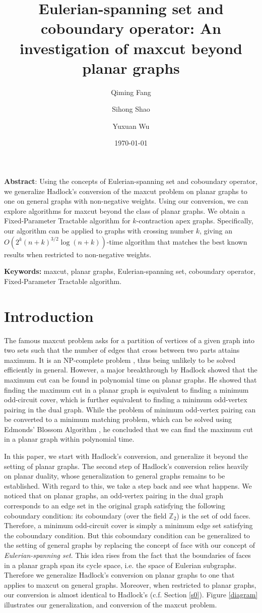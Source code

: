 \documentclass[10pt,fleqn]{article}
\title{Eulerian-spanning set and coboundary operator: An investigation of maxcut beyond planar graphs}
\author{Qiming Fang\footnotemark[1] \and Sihong Shao\footnotemark[3] \and Yuxuan Wu\footnotemark[3]}
\date{\today}
\newcommand{\Z}{\mathbb{Z}}
\begin{document}
	
	\maketitle
	{\small {\textbf{Abstract}:} Using the concepts of Eulerian-spanning set and coboundary operator, we generalize Hadlock's conversion of the maxcut problem on planar graphs to one on general graphs with non-negative weights. Using our conversion, we can explore algorithms for maxcut beyond the class of planar graphs. We obtain a Fixed-Parameter Tractable algorithm for $k$-contraction apex graphs. Specifically, our algorithm can be applied to graphs with crossing number $k$, giving an $O(2^k(n+k)^{3/2}\log (n+k))$-time algorithm that matches the best known results when restricted to non-negative weights.
		
		{\textbf{Keywords:} maxcut, planar graphs, Eulerian-spanning set, coboundary operator, Fixed-Parameter Tractable algorithm.} 
	}
	
	
	\section{Introduction}\label{s1}
	The famous maxcut problem asks for a partition of vertices of a given graph into two sets such that the number of edges that cross between two parts attains maximum. It is an NP-complete problem \cite{80}, thus being unlikely to be solved efficiently in general. However, a major breakthrough by Hadlock \cite{79} showed that the maximum cut can be found in polynomial time on planar graphs. He showed that finding the maximum cut in a planar graph is equivalent to finding a minimum odd-circuit cover, which is further equivalent to finding a minimum odd-vertex pairing in the dual graph. While the problem of minimum odd-vertex pairing can be converted to a minimum matching problem, which can be solved using Edmonds' Blossom Algorithm \cite{104}, he concluded that we can find the maximum cut in a planar graph within polynomial time. \par
	In this paper, we start with Hadlock's conversion, and generalize it beyond the setting of planar graphs. The second step of Hadlock's conversion relies heavily on planar duality, whose generalization to general graphs remains to be established. With regard to this, we take a step back and see what happens. We noticed that on planar graphs, an odd-vertex pairing in the dual graph corresponds to an edge set in the original graph satisfying the following coboundary condition: its coboundary (over the field $\Z_2$) is the set of odd faces. Therefore, a minimum odd-circuit cover is simply a minimum edge set satisfying the coboundary condition. But this coboundary condition can be generalized to the setting of general graphs by replacing the concept of face with our concept of \emph{Eulerian-spanning set}. This idea rises from the fact that the boundaries of faces in a planar graph span its cycle space, i.e. the space of Eulerian subgraphs. Therefore we generalize Hadlock's conversion on planar graphs to one that applies to maxcut on general graphs. Moreover, when restricted to planar graphs, our conversion is almost identical to Hadlock's (c.f. Section \ref{s0}). Figure \ref{diagram} illustrates our generalization, and conversion of the maxcut problem.
\end{document}
